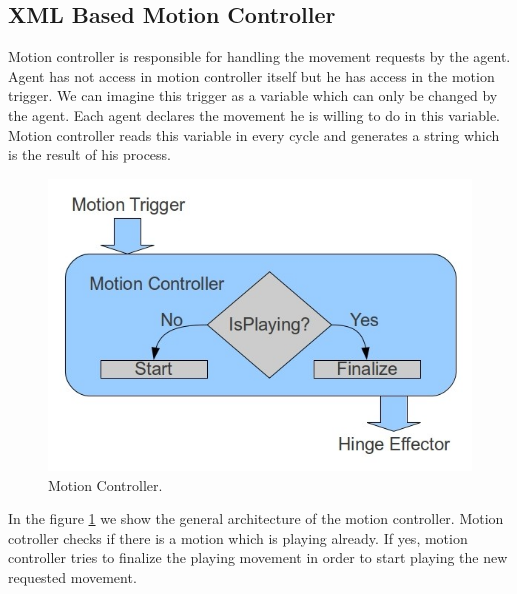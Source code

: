 \subsection{XML Based Motion Controller}
Motion controller is responsible for handling the movement requests by the agent. Agent has not access in motion controller itself but he has access in the motion trigger. We can imagine this trigger as a variable which can only be changed by the agent. Each agent declares the movement he is willing to do in this variable.
Motion controller reads this variable in every cycle and generates a string which is the result of his process.
\begin{figure}[!ht]
\centering
  \includegraphics[scale=0.4]{Chapter3/figures/motions.jpg}
  \caption{Motion Controller.}
  \label{fig:MotionController}
\end{figure}
In the figure \ref{fig:MotionController} we show the general architecture of the motion controller. Motion cotroller checks if there is a motion which is playing already. If yes, motion controller tries to finalize the playing movement in order to start playing the new requested movement.

